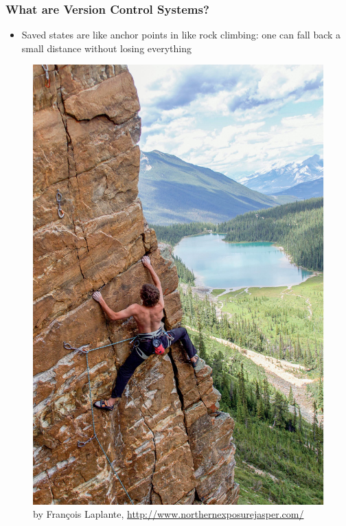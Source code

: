 \begin{frame}[fragile]
\frametitle{What are Version Control Systems?}
    \begin{multicols}{2}
        \begin{itemize}
            \item Saved states are like anchor points in like rock climbing:
                one can fall back a small distance without losing everything
        \end{itemize}
        \begin{figure}
            \centerline{%
                \includegraphics[height=0.8\textheight]{images/northern_exposure_jasper_rock_climbing.jpg}}
                \caption{\tiny by Fran\c{c}ois Laplante, \url{http://www.northernexposurejasper.com/}}
        \end{figure}
    \end{multicols}
\end{frame}


